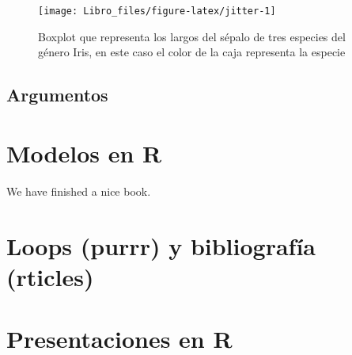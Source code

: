 \documentclass[]{book}
\begin{document}
\begin{figure}

{\centering \texttt{[image: Libro\_files/figure-latex/jitter-1]} 

}

\caption{Boxplot que representa los largos del sépalo de tres especies del género Iris, en este caso el color de la caja representa la especie}\label{fig:jitter}
\end{figure}

\hypertarget{argumentos}{%
\section{Argumentos}\label{argumentos}}

\hypertarget{modelos}{%
\chapter{Modelos en R}\label{modelos}}

We have finished a nice book.

\hypertarget{loops}{%
\chapter{Loops (purrr) y bibliografía (rticles)}\label{loops}}

\hypertarget{presentacion}{%
\chapter{Presentaciones en R}\label{presentacion}}


\end{document}
